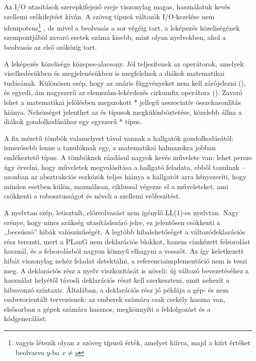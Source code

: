 Az I/O utasítások szerepkifejező ereje viszonylag magas, használatuk kevés szellemi erőkifejtést kíván.
A szöveg típusú változók I/O-kezelése nem idempotens\footnote{%
vagyis létezik olyan $x$ szöveg típusú érték, amelyet kiírva, majd a kiírt értéket beolvasva $y$-ba $x \not= y$}%
, de mivel a beolvasás a sor végéig tart, a leképezés közeliségének szempontjából zavaró esetek száma kisebb, mint olyan nyelvekben, ahol a beolvasás az első szóközig tart. %

A leképezés közelisége közepes-alacsony.
Jól teljesítenek az operátorok, amelyek viselkedésükben és megjelenésükben is megfelelnek a diákok matematikai tudásának.
Különösen szép, hogy az unáris függvényeket nem kell zárójelezni (), és egyedi, ám nagyszerű az elemszám-lekérdezés cirkumfix operátora (). Zavaró lehet a matematikai jelölésben megszokott * jellegű asszociatív összehasonlítás hiánya.
Nehézséget jelenthet az  és  típusok megkülönböztetése, közelebb állna a diákok gondolkodásához egy egyszerű * típus.

A fix méretű tömbök valamelyest távol vannak a hallgatók gondolkodásától: ismerősebb lenne a tanulóknak egy, a matematikai halmazokra jobban emlékeztető típus.
A tömböknek ráadásul nagyok kevés művelete van: lehet persze úgy érvelni, hogy műveletek megvalósítása a hallgató feladata, ebből tanulnak -- azonban az absztrakciós eszközök teljes hiánya a hallgatót arra kényszeríti, hogy minden esetben külön, manuálisan, ciklussal végezze el a műveleteket, ami csökkenti a robosztusságot és növeli a szellemi erőfeszítést.

A nyelvtan szép, letisztult, előreolvasást nem igénylő LL(1)-es nyelvtan. Nagy erénye, hogy nincs szükség utasításlezáró jelre, ez jelentősen csökkenti a ,,becsúszó'' hibák\cite[ld.][4.2.2 rész]{McIver01} valószínűségét.
A legtöbb hibalehetőséget a változódeklarációs rész teremti, mert a PLanG nem deklarációs blokkot, hanem címkézett felsorolást használ, és a felsorolásból nagyon könnyű elhagyni a vesszőt.
Az így keletkezett hibát viszonylag nehéz feladat detektálni, a referenciaimplementáció nem is teszi meg.
A deklarációs rész a nyelv viszkozitását is növeli: új változó bevezetéséhez a használat helyétől távosli deklarációs részt kell szerkeszteni, amit nehezít a hibavonzó szintaxis.
Általában, a deklarációs rész jó példája a gép- és nem emberorientált tervezésnek: az emberek számára csak csekély haszna van, elsősorban a gépek számára hasznos, megkönnyíti a feldolgozást és a kódgenerálást.

